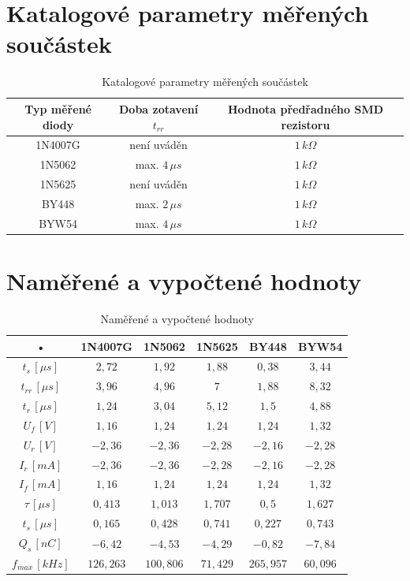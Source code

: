 \documentclass[12pt]{article} %
\begin{document}
\section{Katalogové parametry měřených součástek}
\begin{table}[H]
\caption{Katalogové parametry měřených součástek}
\begin{tabular}{|c|c|c|}
\hline 
Typ měřené diody & Doba zotavení $t_{rr}$ & Hodnota předřadného SMD rezistoru \\ 
\hline 
1N4007G & není uváděn & $1\,k\Omega$ \\ 
\hline 
1N5062 & max. $4\,\mu s$ & $1\,k\Omega$ \\ 
\hline 
1N5625 & není uváděn & $1\,k\Omega$ \\ 
\hline 
BY448 & max. $2\,\mu s$ & $1\,k\Omega$ \\ 
\hline
BYW54 & max. $4\,\mu s$ & $1\,k\Omega$ \\ 
\hline 
\end{tabular} 
\end{table}

\section{Naměřené a vypočtené hodnoty}
\begin{table}[H]
\caption{Naměřené a vypočtené hodnoty}
\begin{tabular}{|c|c|c|c|c|c|}
\hline 
• & 1N4007G & 1N5062 & 1N5625 & BY448 & BYW54 \\ 
\hline 
$t_s\,[\mu s]$ & $2,72$ & $1,92$ & $1,88$ & $0,38$ & $3,44$ \\ 
\hline 
$t_{rr}\,[\mu s]$ & $3,96$ & $4,96$ & $7$ & $1,88$ & $8,32$ \\ 
\hline 
$t_r\,[\mu s]$ & $1,24$ & $3,04$ & $5,12$ & $1,5$ & $4,88$ \\ 
\hline 
$U_f\,[V]$ & $1,16$ & $1,24$ & $1,24$ & $1,24$ & $1,32$ \\ 
\hline 
$U_r\,[V]$ & $-2,36$ & $-2,36$ & $-2,28$ & $-2,16$ & $-2,28$ \\ 
\hline 
$I_r\,[mA]$ & $-2,36$ & $-2,36$ & $-2,28$ & $-2,16$ & $-2,28$ \\ 
\hline 
$I_f\,[mA]$ & $1,16$ & $1,24$ & $1,24$ & $1,24$ & $1,32$ \\ 
\hline 
$\tau\,[\mu s]$ & $0,413$ & $1,013$ & $1,707$ & $0,5$ & $1,627$ \\ 
\hline 
$t_s\,[\mu s]$ & $0,165$ & $0,428$ & $0,741$ & $0,227$ & $0,743$ \\ 
\hline 
$Q_s\,[nC]$ & $-6,42$ & $-4,53$ & $-4,29$ & $-0,82$ & $-7,84$ \\ 
\hline 
$f_{max}\,[kHz]$ & $126,263$ & $100,806$ & $71,429$ & $265,957$ & $60,096$ \\ 
\hline 
\end{tabular} 
\end{table}
\end{document}
